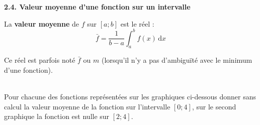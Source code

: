 \documentclass[11pt,a4paper]{article}
\newcommand{\cor}[1]{%
	\begin{tcolorbox}[
		colback=blue!5!white,
		colframe=blue!70!black,
		boxrule=1pt,
		arc=3pt,
		left=4pt, right=4pt, top=2pt, bottom=2pt,
		before skip=1mm, after skip=2mm
	]
	\color{blue!80!black}#1
	\end{tcolorbox}%
}
\begin{document}
	\vfill 
	
	
	\begin{mybox}
		\begin{center}
			\textbf{2.4. Valeur moyenne d'une fonction sur un intervalle}
		\end{center}
	\end{mybox}
	
	
	
	
	\cor{
		\vspace{8mm}
		La \textbf{valeur moyenne} de $f$ sur $[a;b]$ est le réel :
	$$\bar{f} = \dfrac{1}{b-a}\int_a^b f(x)\,\mathrm{d}x$$
	
	\vspace{8mm}
	
	}

	Ce réel est parfois noté $\bar{f}$ ou $m$ (lorsqu'il n'y a pas d'ambiguïté avec le minimum d'une fonction). 
	
	\vfill
	
	\\
	
	Pour chacune des fonctions représentées sur les graphiques ci-dessous donner sans calcul la valeur moyenne de la fonction sur l'intervalle $[0 ; 4]$, sur le second graphique la fonction est nulle sur $[2 ; 4]$.
	
\end{document}
